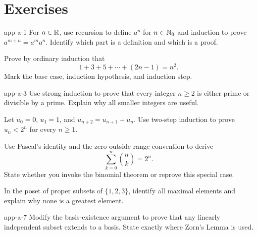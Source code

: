 \section*{Exercises}
\begin{hexercise}{app-a-1}
For $a\in\mathbb{R}$, use recursion to define \(a^n\) for \(n\in\mathbb{N}_0\) and induction to prove
\(a^{m+n}=a^ma^n\). Identify which part is a definition and which is a proof.
\end{hexercise}
\begin{exercise}
Prove by ordinary induction that
\[
1+3+5+\cdots+(2n-1)=n^2.
\]
Mark the base case, induction hypothesis, and induction step.
\end{exercise}
\begin{hexercise}{app-a-3}
Use strong induction to prove that every integer \(n\geq2\) is either prime
or divisible by a prime. Explain why all smaller integers are useful.
\end{hexercise}
\begin{exercise}
Let \(u_0=0\), \(u_1=1\), and \(u_{n+2}=u_{n+1}+u_n\). Use two-step
induction to prove \(u_n<2^n\) for every \(n\geq1\).
\end{exercise}
\begin{exercise}
Use Pascal's identity and the zero-outside-range convention to derive
\[
\sum_{k=0}^n\binom nk=2^n.
\]
State whether you invoke the binomial theorem or reprove this special case.
\end{exercise}
\begin{exercise}
In the poset of proper subsets of \(\{1,2,3\}\), identify all maximal
elements and explain why none is a greatest element.
\end{exercise}
\begin{hexercise}{app-a-7}
Modify the basis-existence argument to prove that any linearly independent
subset extends to a basis. State exactly where Zorn's Lemma is used.
\end{hexercise}
